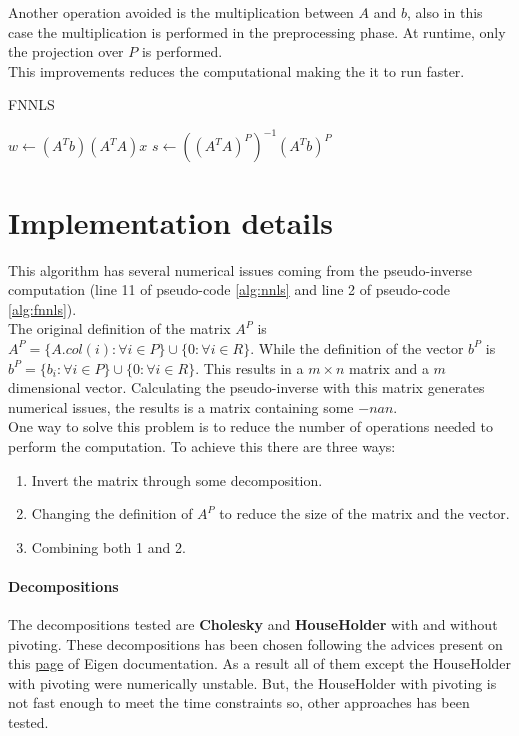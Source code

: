 Another operation avoided is the multiplication between $A$ and $b$, also in this case the multiplication is performed in the preprocessing phase. At runtime, only the projection over $P$ is performed. \\
This improvements reduces the computational making the it to run faster. 
\begin{algorithm}[h]
  \caption{FNNLS}
  \label{alg:fnnls}
  \begin{algorithmic}[1]
    \State $w \gets (A^T b) (A^T A)x $
    \State $s \gets ((A^TA)^P)^{-1} (A^Tb)^P$
  \end{algorithmic}
\end{algorithm}
\section{Implementation details}
This algorithm has several numerical issues coming from the pseudo-inverse computation (line 11 of pseudo-code \ref{alg:nnls} and line 2 of pseudo-code \ref{alg:fnnls}). \\
The original definition of the matrix $A^P$ is $A^P=\{A.col(i) : \forall i \in P\} \cup \{0: \forall i \in R\}$. While the definition of the vector $b^P$ is $b^P=\{b_i : \forall i \in P\} \cup \{0: \forall i \in R\}$. This results in a $m \times n$ matrix and a $m$ dimensional vector. Calculating the pseudo-inverse with this matrix generates numerical issues, the results is a matrix containing some $-nan$.\\
One way to solve this problem is to reduce the number of operations needed to perform the computation. To achieve this there are three ways:
\begin{enumerate}
  \item Invert the matrix through some decomposition.
  \item Changing the definition of $A^P$ to reduce the size of the matrix and the vector.
  \item Combining both 1 and 2.
\end{enumerate}
\paragraph{Decompositions}
The decompositions tested are \textbf{Cholesky} and \textbf{HouseHolder} with and without pivoting. These decompositions has been chosen following the advices present on this \href{https://eigen.tuxfamily.org/dox/group__LeastSquares.html}{page} of Eigen documentation. As a result all of them except the HouseHolder with pivoting were numerically unstable. But, the HouseHolder with pivoting is not fast enough to meet the time constraints so, other approaches has been tested.
